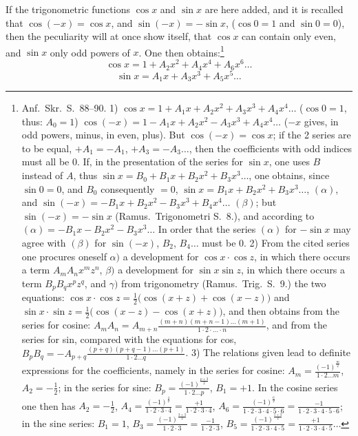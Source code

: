 \documentclass[12pt]{book}
\begin{document}
If the trigonometric functions $\cos x$ and $\sin x$ are here added, and it is
recalled that $\cos(-x) = \cos x$, and $\sin(-x) = -\sin x$, ($\cos 0 = 1$ and
$\sin 0 = 0$), then the peculiarity will at once show itself, that $\cos x$ can
contain only even, and $\sin x$ only odd powers of $x$. One then obtains:\footnote{Anf.\
Skr.\ S.\ 88--90.
1) $\cos x = 1 + A_1 x + A_2 x^{2} + A_3 x^{3} + A_4 x^{4}\dots$ ($\cos 0 = 1$,
thus: $A_0 = 1$)
$\cos(-x) = 1 - A_1 x + A_2 x^{2} - A_3 x^{3} + A_4 x^{4}\dots$ ($-x$ gives, in
odd powers, minus, in even, plus).
But $\cos(-x) = \cos x$; if the 2 series are to be equal, $+A_1 = -A_1$,
$+A_3 = -A_3\dots$, then the coefficients with odd indices must all be 0.
If, in the presentation of the series for $\sin x$, one uses $B$ instead of $A$,
thus $\sin x = B_0 + B_1 x + B_2 x^{2} + B_3 x^{3}\dots$, one obtains, since
$\sin 0 = 0$, and $B_0$ consequently $= 0$, $\sin x = B_1 x + B_2 x^{2} +
B_3 x^{3}\dots$, $(\alpha)$, and $\sin(-x) = -B_1 x + B_2 x^{2} - B_3 x^{3} +
B_4 x^{4}\dots$ $(\beta)$; but $\sin(-x) = -\sin x$ (Ramus.\ Trigonometri S.\
8.), and according to $(\alpha) = -B_1 x - B_2 x^{2} - B_3 x^{3}\dots$ In order that
the series $(\alpha)$ for $-\sin x$ may agree with $(\beta)$ for $\sin(-x)$, $B_2$,
$B_4\dots$ must be 0.
2) From the cited series one procures oneself $\alpha)$ a development for
$\cos x\cdot\cos z$, in which there occurs a term $A_m A_n x^{m}z^{n}$,
$\beta)$ a development for $\sin x\sin z$, in which there occurs a term
$B_p B_q x^{p}z^{q}$, and $\gamma)$ from trigonometry (Ramus.\ Trig.\ S.\ 9.) the
two equations: $\cos x\cdot\cos z = \frac{1}{2}\big(\cos(x+z) + \cos(x-z)\big)$ and
$\sin x\cdot\sin z = \frac{1}{2}\big(\cos(x-z) - \cos(x+z)\big)$, and then obtains
from the series for cosine: $A_m A_n = A_{m+n}\frac{(m+n)(m+n-1)\dots(m+1)}{1\cdot
2\cdot\dots\cdot n}$, and from the series for sin, compared with the equations for
cos, $B_p B_q = -A_{p+q}\frac{(p+q)(p+q-1)\dots(p+1)}{1\cdot 2\dots q}$.
3) The relations given lead to definite expressions for the coefficients, namely in
the series for cosine: $A_m = \frac{(-1)^{\frac{m}{2}}}{1\cdot 2\dots m}$,
$A_2 = -\frac{1}{2}$; in the series for sine: $B_p =
\frac{(-1)^{\frac{p+3}{2}}}{1\cdot 2\dots p}$, $B_1 = +1$. In the cosine series one
then has $A_2 = -\frac{1}{2}$, $A_4 = \frac{(-1)^{\frac{4}{2}}}{1\cdot 2\cdot 3\cdot 4}
= \frac{+1}{1\cdot 2\cdot 3\cdot 4}$, $A_6 = \frac{(-1)^{\frac{6}{2}}}{1\cdot
2\cdot 3\cdot 4\cdot 5\cdot 6} = \frac{-1}{1\cdot 2\cdot 3\cdot 4\cdot 5\cdot 6}$;
in the sine series: $B_1 = 1$, $B_3 = \frac{(-1)^{\frac{3+3}{2}}}{1\cdot 2\cdot 3} =
\frac{-1}{1\cdot 2\cdot 3}$, $B_5 = \frac{(-1)^{\frac{5+3}{2}}}{1\cdot 2\cdot
3\cdot 4\cdot 5} = \frac{+1}{1\cdot 2\cdot 3\cdot 4\cdot 5}\dots$}
\[
\cos x = 1 + A_2 x^{2} + A_4 x^{4} + A_6 x^{6}\dots
\]
\[
\sin x = A_1 x + A_3 x^{3} + A_5 x^{5}\dots
\]
\end{document}
